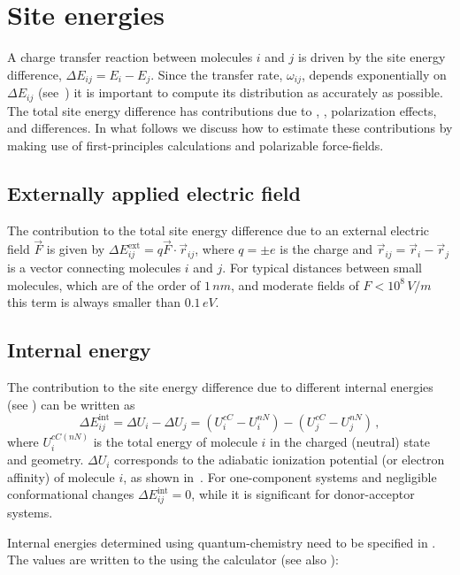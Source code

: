 \section{Site energies}
\label{sec:site_energies}
A charge transfer reaction between molecules $i$ and $j$ is driven by the site 
energy difference, $\Delta E_{ij} = E_i - E_j$. Since the  
transfer rate, $\omega_{ij}$, depends exponentially on $\Delta E_{ij}$ 
(see~) it is important to compute its distribution as accurately as 
possible.  The total site energy difference has contributions due to 
, 
, polarization effects, and 
 differences. In what follows we 
discuss how to estimate these contributions by making use of first-principles 
calculations and polarizable force-fields.

\subsection{Externally applied electric field}
\label{sec:ext_field}
The contribution to the total site energy 
difference due to an external electric field $\vec{F}$ is given by $\Delta 
E_{ij}^\text{ext} = q {\vec{F} \cdot \vec{r}_{ij}}$, where $q=\pm e$ is the 
charge and $\vec{r}_{ij} = \vec{r}_i  - \vec{r}_j $ is a vector connecting 
molecules $i$ and $j$. For typical distances between small molecules, which are 
of the order  of $1\,\unit{nm}$, and moderate fields of $F<10^8\,\unit{V/m}$ 
this term is always smaller than $0.1\, \unit{eV}$.

\subsection{Internal energy}
\label{sec:internal_energy}

The contribution to the site energy difference due to different internal 
energies (see ) can be written as
\begin{equation}
 \Delta E_{ij}^\text{int}=
\Delta U_i - \Delta U_j = \left( U_{i}^{cC}-U_{i}^{nN}\right) - \left( 
U_{j}^{cC}-U_{j}^{nN}\right) \, ,
\label{equ:conformational}
\end{equation}
where $U_{i}^{cC(nN)}$ is the total energy of molecule $i$ in the charged 
(neutral) state and geometry.  $\Delta U_{i}$ corresponds to the adiabatic 
ionization potential (or electron affinity) of molecule $i$, as shown 
in~. For one-component systems and negligible conformational 
changes $ \Delta E_{ij}^\text{int}=0$, while it is significant for 
donor-acceptor systems. 

Internal energies determined using quantum-chemistry need to be specified in 
\xmlmap. The values are written to the \sqlstate using the calculator 
 (see also ):
